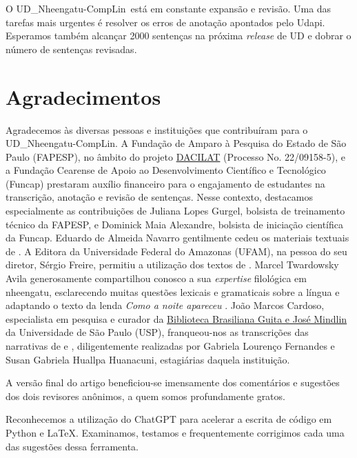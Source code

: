 \documentclass[portuguese]{textolivre}
\newcommand{\tbc}{UD\_Nheengatu-CompLin}
\begin{document}
O \tbc~está em constante expansão e revisão. Uma das tarefas mais urgentes é resolver os erros de anotação apontados pelo Udapi. Esperamos também alcançar 2000 sentenças na próxima \textit{release} de UD e dobrar o número de sentenças revisadas.

\section*{Agradecimentos}

Agradecemos às diversas pessoas e instituições que contribuíram para o \tbc. A Fundação de Amparo à Pesquisa do Estado de São Paulo (FAPESP), no âmbito do projeto \href{https://bv.fapesp.br/57063}{DACILAT} (Processo No. 22/09158-5), e a Fundação Cearense de Apoio ao Desenvolvimento Científico e Tecnológico (Funcap) prestaram auxílio financeiro para o engajamento de estudantes na transcrição, anotação e revisão de sentenças. Nesse contexto, destacamos especialmente as contribuições de Juliana Lopes Gurgel, bolsista de treinamento técnico da FAPESP, e Dominick Maia Alexandre, bolsista de iniciação científica da Funcap. Eduardo de Almeida Navarro gentilmente cedeu os materiais textuais de \textcite{navarro2016}. A Editora da Universidade Federal do Amazonas (UFAM), na pessoa do seu diretor, Sérgio Freire, permitiu a utilização dos textos de \textcite{casasnovas2006}. Marcel Twardowsky Avila generosamente compartilhou conosco a sua \textit{expertise} filológica em nheengatu, esclarecendo muitas questões lexicais e gramaticais sobre a língua e adaptando o texto da lenda \textit{Como a noite apareceu} \parencite{magalhaes1876}. João Marcos Cardoso, especialista em pesquisa e curador da \href{https://www.bbm.usp.br/pt-br/}{Biblioteca Brasiliana Guita e José Mindlin} da Universidade de São Paulo (USP), franqueou-nos as transcrições das narrativas de \textcite{Amorim1928} e \textcite{rodrigues1890}, diligentemente realizadas por Gabriela Lourenço Fernandes e Susan Gabriela Huallpa Huanacuni, estagiárias daquela instituição. 

A versão final do artigo beneficiou-se imensamente dos comentários e sugestões dos dois revisores anônimos, a quem somos profundamente gratos. 

Reconhecemos a utilização do ChatGPT para acelerar a escrita de código em Python e \LaTeX. Examinamos, testamos e frequentemente corrigimos cada uma das sugestões dessa ferramenta.

\printbibliography\label{sec:bib}
\end{document}
